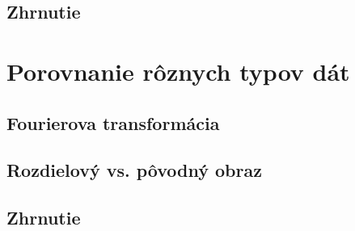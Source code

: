 \todo

\subsection{Zhrnutie}

\todo

\section{Porovnanie rôznych typov dát}

\todo 

\subsection{Fourierova transformácia}

\todo 

\subsection{Rozdielový vs. pôvodný obraz}

\todo 

\subsection{Zhrnutie}

\todo 



